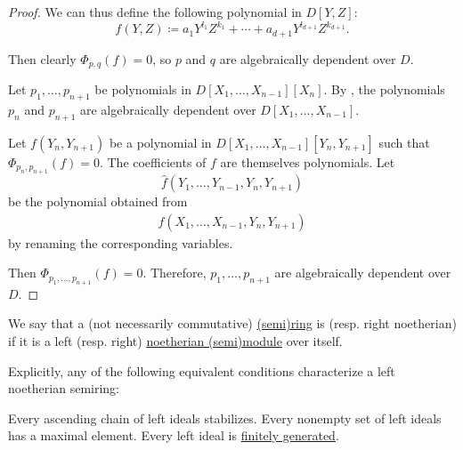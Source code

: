 \begin{proof}
  We can thus define the following polynomial in \( D[Y, Z] \):
  \begin{equation*}
    f(Y, Z) \coloneqq a_1 Y^{l_1} Z^{k_1} + \cdots + a_{d+1} Y^{l_{d+1}} Z^{k_{d+1}}.
  \end{equation*}

  Then clearly \( \Phi_{p,q}(f) = 0 \), so \( p \) and \( q \) are algebraically dependent over \( D \).

   Let \( p_1, \ldots, p_{n+1} \) be polynomials in \( D[X_1, \ldots, X_{n-1}][X_n] \). By , the polynomials \( p_n \) and \( p_{n+1} \) are algebraically dependent over \( D[X_1, \ldots, X_{n-1}] \).

  Let \( f(Y_n, Y_{n+1}) \) be a polynomial in \( D[X_1, \ldots, X_{n-1}][Y_n, Y_{n+1}] \) such that \( \Phi_{p_n,p_{n+1}}(f) = 0 \). The coefficients of \( f \) are themselves polynomials. Let
  \begin{equation*}
    \widehat{f}(Y_1, \ldots, Y_{n-1}, Y_n, Y_{n+1})
  \end{equation*}
  be the polynomial obtained from
  \begin{align*}
    f(X_1, \ldots, X_{n-1}, Y_n, Y_{n+1})
  \end{align*}
  by renaming the corresponding variables.

  Then \( \Phi_{p_1,\ldots,p_{n+1}}(f) = 0 \). Therefore, \( p_1, \ldots, p_{n+1} \) are algebraically dependent over \( D \).
\end{proof}

\begin{definition}\label{def:noetherian_semiring}
  We say that a (not necessarily commutative) \hyperref[def:semiring]{(semi)ring} is  (resp. right noetherian) if it is a left (resp. right) \hyperref[def:noetherian_semimodule]{noetherian (semi)module} over itself.

  Explicitly, any of the following equivalent conditions characterize a left noetherian semiring:
  \begin{thmenum}
     Every ascending chain of left ideals stabilizes.
     Every nonempty set of left ideals has a maximal element.
     Every left ideal is \hyperref[def:semiring_ideal/generated]{finitely generated}.
  \end{thmenum}
\end{definition}

